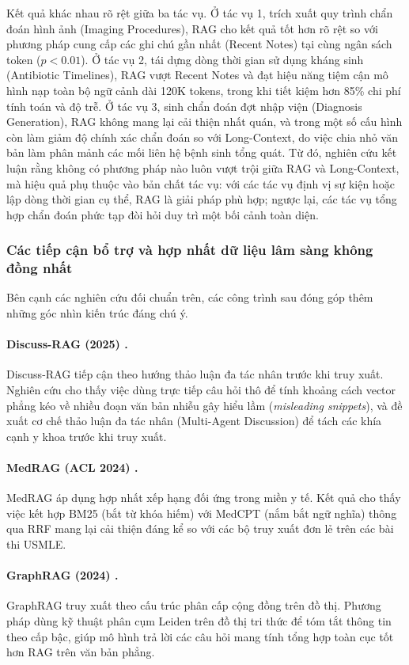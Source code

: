 Kết quả khác nhau rõ rệt giữa ba tác vụ. Ở tác vụ 1, trích xuất quy trình chẩn đoán hình ảnh (Imaging Procedures), RAG cho kết quả tốt hơn rõ rệt so với phương pháp cung cấp các ghi chú gần nhất (Recent Notes) tại cùng ngân sách token ($p < 0.01$). Ở tác vụ 2, tái dựng dòng thời gian sử dụng kháng sinh (Antibiotic Timelines), RAG vượt Recent Notes và đạt hiệu năng tiệm cận mô hình nạp toàn bộ ngữ cảnh dài 120K tokens, trong khi tiết kiệm hơn 85\% chi phí tính toán và độ trễ. Ở tác vụ 3, sinh chẩn đoán đợt nhập viện (Diagnosis Generation), RAG không mang lại cải thiện nhất quán, và trong một số cấu hình còn làm giảm độ chính xác chẩn đoán so với Long-Context, do việc chia nhỏ văn bản làm phân mảnh các mối liên hệ bệnh sinh tổng quát. Từ đó, nghiên cứu kết luận rằng không có phương pháp nào luôn vượt trội giữa RAG và Long-Context, mà hiệu quả phụ thuộc vào bản chất tác vụ: với các tác vụ định vị sự kiện hoặc lập dòng thời gian cụ thể, RAG là giải pháp phù hợp; ngược lại, các tác vụ tổng hợp chẩn đoán phức tạp đòi hỏi duy trì một bối cảnh toàn diện.

\subsubsection{Các tiếp cận bổ trợ và hợp nhất dữ liệu lâm sàng không đồng nhất}
Bên cạnh các nghiên cứu đối chuẩn trên, các công trình sau đóng góp thêm những góc nhìn kiến trúc đáng chú ý.

\paragraph{Discuss-RAG (2025) \cite{dong2025discuss}.}
Discuss-RAG tiếp cận theo hướng thảo luận đa tác nhân trước khi truy xuất. Nghiên cứu cho thấy việc dùng trực tiếp câu hỏi thô để tính khoảng cách vector phẳng kéo về nhiều đoạn văn bản nhiễu gây hiểu lầm (\emph{misleading snippets}), và đề xuất cơ chế thảo luận đa tác nhân (Multi-Agent Discussion) để tách các khía cạnh y khoa trước khi truy xuất.

\paragraph{MedRAG (ACL 2024) \cite{xiong2024medrag}.}
MedRAG áp dụng hợp nhất xếp hạng đối ứng trong miền y tế. Kết quả cho thấy việc kết hợp BM25 (bắt từ khóa hiếm) với MedCPT (nắm bắt ngữ nghĩa) thông qua RRF mang lại cải thiện đáng kể so với các bộ truy xuất đơn lẻ trên các bài thi USMLE.

\paragraph{GraphRAG (2024) \cite{edge2024graphrag}.}
GraphRAG truy xuất theo cấu trúc phân cấp cộng đồng trên đồ thị. Phương pháp dùng kỹ thuật phân cụm Leiden trên đồ thị tri thức để tóm tắt thông tin theo cấp bậc, giúp mô hình trả lời các câu hỏi mang tính tổng hợp toàn cục tốt hơn RAG trên văn bản phẳng.

